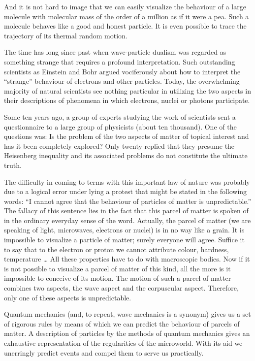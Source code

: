 And it is not hard to image that we can easily visualize the behaviour of a large molecule with molecular mass of the order of a million as if it were a pea. Such a molecule behaves like a good and honest particle. It is even possible to trace the trajectory of its thermal random motion.

The time has long since past when wave-particle dualism was regarded as something strange that requires a profound interpretation. Such outstanding scientists as Einstein and Bohr argued vociferously about how to interpret the ``strange'' behaviour of electrons and other particles. Today, the overwhelming majority of natural scientists see nothing particular in utilizing the two as­pects in their descriptions of phenomena in which elec­trons, nuclei or photons participate.

Some ten years ago, a group of experts studying the work of scientists sent a questionnaire to a large group of physicists (about ten thousand). One of the questions was: Is the problem of the two aspects of matter of topical interest and has it been completely explored? Only twenty replied that they presume the Heisenberg inequality and its associated problems do not constitute the ultimate truth.

The difficulty in coming to terms with this important law of nature was probably due to a logical error under­ lying a protest that might be stated in the following words: ``I cannot agree that the behaviour of particles of matter is unpredictable.'' The fallacy of this sentence lies in the fact that this parcel of matter is spoken of in the ordinary everyday sense of the word. Actually, the parcel of matter (we are speaking of light, microwaves, electrons or nuclei) is in no way like a grain. It is impossible to visualize a particle of matter; surely everyone will agree. Suffice it to say that to the electron or proton we cannot attribute colour, hardness, temperature \ldots{} All these properties have to do with macroscopic bodies. Now if
it is not possible to visualize a parcel of matter of this kind, all the more is it impossible to conceive of its motion. The motion of such a parcel of matter combines two aspects, the wave aspect and the corpuscular aspect. Therefore, only one of these aspects is unpredictable.

Quantum mechanics (and, to repeat, wave mechanics is a synonym) gives us a set of rigorous rules by means of which we can predict the behaviour of parcels of matter. A description of particles by the methods of quantum mechanics gives an exhaustive representation of the reg­ularities of the microworld. With its aid we unerringly predict events and compel them to serve us practically.

